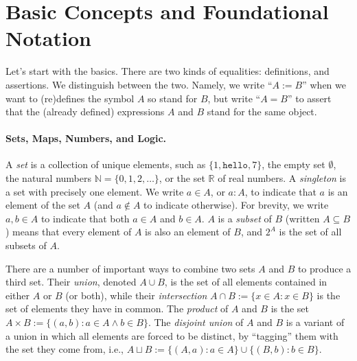 \section{Basic Concepts and Foundational Notation}

Let's start with the basics.
There are two kinds of equalities: definitions, and assertions. 
We distinguish between the two.
Namely, we write ``$A := B$'' when we want to (re)defines the symbol $A$ so stand for $B$,
but write ``$A = B$'' to assert that the (already defined) expressions $A$ and $B$ stand for the same object.
%


    \label{ref:prelim-basic}

\paragraph{Sets, Maps, Numbers, and Logic.}
A \emph{set} is a collection of unique elements, 
    such as 
    $\{1, \texttt{hello}, 7\}$,
    the empty set $\emptyset$, 
    the natural numbers $\mathbb N = \{0, 1, 2, \ldots \}$,
    or the set $\mathbb R$ of real numbers. 
A \emph{singleton} is a set with precisely one element. 
We write $a \in A$, or $a : A$, 
    to indicate that $a$ is an element of the set $A$
    (and $a \notin A$ to indicate otherwise).
For brevity, we write $a,b \in A$ to indicate that both $a \in A$ and $b \in A$. 
$A$ is a \emph{subset} of $B$ (written $A \subseteq B$) means that every element of $A$ is also an element of $B$, and $2^A$ is the set of all subsets of $A$.

There are a number of important ways to combine two sets $A$ and $B$ to produce a third set.  
Their \emph{union}, denoted $A \cup B$, is the set of all elements contained in either $A$ or $B$ (or both),
while their \emph{intersection} $A \cap B := \{x \in A : x \in B\}$ is the set of elements they have in common.
The \emph{product} of $A$ and $B$ is the set $A \times B := \{ (a,b) : a \in A \land b \in B\}$. 
The \emph{disjoint union} of $A$ and $B$ is a variant of a union in which all elements are forced to be distinct, by ``tagging'' them with the set they come from, i.e., 
$
    A \sqcup B := \{ (A, a) : a \in A \} \cup \{ (B, b) : b \in B \}. 
$

